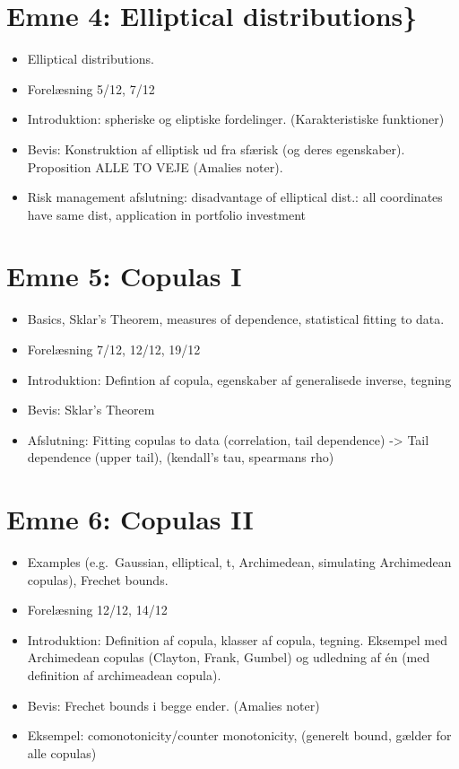 \documentclass[
]{book}
\providecommand{\tightlist}{%
  \setlength{\itemsep}{0pt}\setlength{\parskip}{0pt}}
\begin{document}
\hypertarget{emne-4-elliptical-distributions}{%
\section{Emne 4: Elliptical distributions\}}\label{emne-4-elliptical-distributions}}

\begin{itemize}
\tightlist
\item
  Elliptical distributions.
\item
  Forelæsning 5/12, 7/12
\item
  Introduktion: spheriske og eliptiske fordelinger. (Karakteristiske funktioner)
\item
  Bevis: Konstruktion af elliptisk ud fra sfærisk (og deres egenskaber). Proposition ALLE TO VEJE (Amalies noter).
\item
  Risk management afslutning: disadvantage of elliptical dist.: all coordinates have same dist, application in portfolio investment
\end{itemize}

\hypertarget{emne-5-copulas-i}{%
\section{Emne 5: Copulas I}\label{emne-5-copulas-i}}

\begin{itemize}
\tightlist
\item
  Basics, Sklar's Theorem, measures of dependence, statistical fitting to data.
\item
  Forelæsning 7/12, 12/12, 19/12
\item
  Introduktion: Defintion af copula, egenskaber af generalisede inverse, tegning
\item
  Bevis: Sklar's Theorem
\item
  Afslutning: Fitting copulas to data (correlation, tail dependence) -\textgreater{} Tail dependence (upper tail), (kendall's tau, spearmans rho)
\end{itemize}

\hypertarget{emne-6-copulas-ii}{%
\section{Emne 6: Copulas II}\label{emne-6-copulas-ii}}

\begin{itemize}
\tightlist
\item
  Examples (e.g.~Gaussian, elliptical, t, Archimedean, simulating Archimedean copulas), Frechet bounds.
\item
  Forelæsning 12/12, 14/12
\item
  Introduktion: Definition af copula, klasser af copula, tegning. Eksempel med Archimedean copulas (Clayton, Frank, Gumbel) og udledning af én (med definition af archimeadean copula).
\item
  Bevis: Frechet bounds i begge ender. (Amalies noter)
\item
  Eksempel: comonotonicity/counter monotonicity, (generelt bound, gælder for alle copulas)
\end{itemize}
\end{document}
